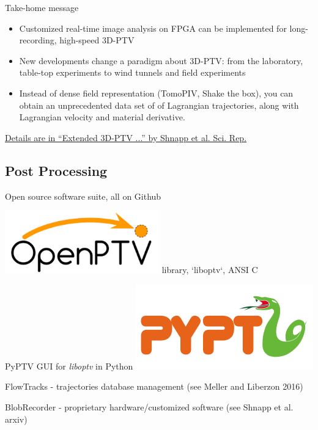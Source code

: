 \documentclass[aspectratio=43]{beamer}
\begin{document}
\begin{frame}{Take-home message}
\begin{itemize}
\item Customized real-time image analysis on FPGA can be implemented for long-recording, high-speed 3D-PTV
\item New developments change a paradigm about 3D-PTV: from the laboratory, table-top experiments to wind tunnels and field experiments
\item Instead of dense field representation (TomoPIV, Shake the box),  you can obtain an unprecedented data set of of Lagrangian trajectories, along with Lagrangian velocity and material derivative. 
\end{itemize}

\begin{cardTiny}\href{https://www.nature.com/articles/s41598-019-43555-2}{Details are in ``Extended 3D-PTV ...'' by Shnapp et al. Sci. Rep.}
\end{cardTiny}

\end{frame}
%

%
%

	 
\subsection{Post Processing}

\begin{frame}{Open source software suite, all on Github}
\itemize
\item \includegraphics[width=0.5\textwidth]{openptv} \hspace{1em} library, `liboptv`, ANSI C
\item PyPTV GUI for {\em liboptv} in Python \includegraphics[width=.3\textwidth]{pyptv}
\item FlowTracks - trajectories database management (see Meller and Liberzon 2016)
\item BlobRecorder - proprietary hardware/customized software (see Shnapp et al. arxiv)
\end{frame}
\end{document}
